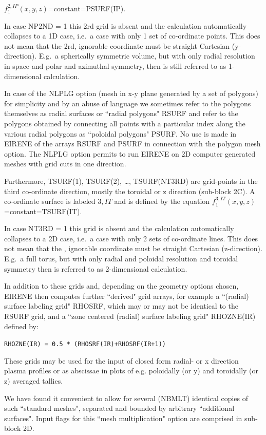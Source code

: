 $f_1^{2,IP} (x,y,z) $=constant=PSURF(IP).

In case NP2ND = 1 this 2rd grid is absent and the calculation automatically
collapses to a 1D case, i.e.\ a case with only 1 set of co-ordinate points.
This does not mean that the 2rd, ignorable coordinate must be straight
Cartesian (y-direction).
E.g.\ a spherically symmetric volume, but with only radial resolution in space
and polar and azimuthal symmetry, then is still referred to as 1-dimensional
calculation.

In case of the NLPLG option (mesh in x-y plane generated by a set of polygons)
for simplicity and by an abuse of language we sometimes refer to the polygons
themselves as radial surfaces or ``radial polygons" RSURF and refer to the
polygons obtained by connecting all points with a particular index along the
various radial polygons as ``poloidal polygons" PSURF.
No use is made in EIRENE of the arrays RSURF and PSURF in connection with the
polygon mesh option.
The NLPLG option permits to run EIRENE on 2D computer generated meshes with
grid cuts in one direction.

Furthermore, TSURF(1), TSURF(2), \dots, TSURF(NT3RD) are grid-points in the
third co-or\-di\-nate direction, mostly the toroidal or z direction (sub-block
2C).
A co-ordinate surface is labeled $3,IT$ and is defined by the equation
$f_1^{3,IT} (x,y,z)$ =constant=TSURF(IT).

In case NT3RD = 1 this  grid is absent and the calculation
automatically collapses to a 2D case, i.e.\ a case with only 2 sets of
co-ordinate lines.
This does not mean that the , ignorable coordinate must be
straight Cartesian (z-direction).
E.g.\ a full torus, but with only radial and poloidal resolution and toroidal
symmetry then is referred to as 2-dimensional calculation.

In addition to these grids and, depending on the geometry options chosen,
EIRENE then computes further ``derived" grid arrays, for example a ``(radial)
surface labeling grid" RHOSRF, which may or may not be identical to the RSURF
grid, and a ``zone centered (radial) surface labeling grid" RHOZNE(IR) defined
by:

\lstinline|RHOZNE(IR) = 0.5 * (RHOSRF(IR)+RHOSRF(IR+1))|

These grids may be used for the input of closed form radial- or x direction
plasma profiles or as abscissae in plots of e.g. poloidally (or y) and
toroidally (or z) averaged tallies.

We have found it convenient to allow for several (NBMLT) identical copies of
such ``standard meshes", separated and bounded by arbitrary ``additional
surfaces".
Input flags for this ``mesh multiplication" option are comprised in sub-block
2D.

